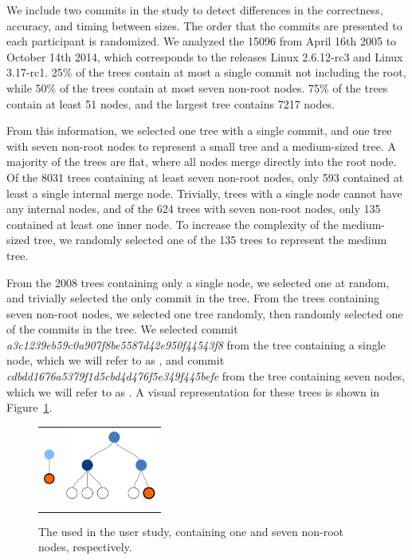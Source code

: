 We include two commits in the study to detect differences in the
correctness, accuracy, and timing between \mt sizes. The order that the
commits are presented to each participant is randomized. We analyzed the
15096  from April 16th 2005 to October 14th 2014, which
corresponds to the releases Linux 2.6.12-rc3 and Linux 3.17-rc1. 25\% of
the trees contain at most a single commit not including the root, while
50\% of the trees contain at most seven non-root nodes. 75\% of the
trees contain at least 51 nodes, and the largest tree contains 7217
nodes.

From this information, we selected one tree with a single commit, and
one tree with seven non-root nodes to represent a small tree and a
medium-sized tree. A majority of the trees are flat, where all nodes
merge directly into the root node. Of the 8031 trees containing at least
seven non-root nodes, only 593 contained at least a single internal
merge node. Trivially, trees with a single node cannot have any internal
nodes, and of the 624 trees with seven non-root nodes, only 135
contained at least one inner node. To increase the complexity of the
medium-sized tree, we randomly selected one of the 135 trees to
represent the medium tree.

From the 2008 trees containing only a single node, we selected one at
random, and trivially selected the only commit in the tree. From the
trees containing seven non-root nodes, we selected one tree randomly,
then randomly selected one of the commits in the tree. We selected
commit \emph{a3c1239eb59c0a907f8be5587d42e950f44543f8} from the tree
containing a single node, which we will refer to as \comA, and commit
\emph{cdbdd1676a5379f1d5cbd4d476f5e349f445befe} from the tree containing
seven nodes, which we will refer to as \comB. A visual representation
for these trees is shown in Figure~\ref{fig:study_commits}.

\begin{figure}[bpt]
  \centering
  \begin{tabular}{ m{1.5cm} m{3cm} }
    \includegraphics[height=0.5in]{figures/commits/1-commit.pdf} &
    \includegraphics[height=1in]{figures/commits/7-commits.pdf}\\
  \end{tabular}
  \caption{The  used in the user study,
    containing one and seven non-root nodes, respectively.}
  \label{fig:study_commits}
\end{figure}

